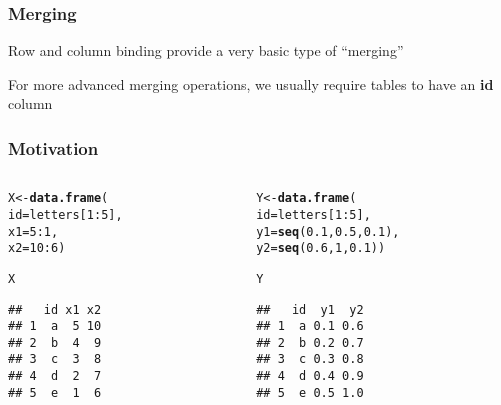 \documentclass[12pt]{beamer}\usepackage[]{graphicx}\usepackage[]{color}
\makeatletter
\newcommand{\hlnum}[1]{\textcolor[rgb]{0.686,0.059,0.569}{#1}}%
\newcommand{\hlopt}[1]{\textcolor[rgb]{0,0,0}{#1}}%
\newcommand{\hlstd}[1]{\textcolor[rgb]{0.345,0.345,0.345}{#1}}%
\newcommand{\hlkwb}[1]{\textcolor[rgb]{0.69,0.353,0.396}{#1}}%
\newcommand{\hlkwc}[1]{\textcolor[rgb]{0.333,0.667,0.333}{#1}}%
\newcommand{\hlkwd}[1]{\textcolor[rgb]{0.737,0.353,0.396}{\textbf{#1}}}%
\newenvironment{kframe}{%
 \def\at@end@of@kframe{}%
 \ifinner\ifhmode%
  \def\at@end@of@kframe{\end{minipage}}%
  \begin{minipage}{\columnwidth}%
 \fi\fi%
 \def\FrameCommand##1{\hskip\@totalleftmargin \hskip-\fboxsep
 \colorbox{shadecolor}{##1}\hskip-\fboxsep
     \hskip-\linewidth \hskip-\@totalleftmargin \hskip\columnwidth}%
 \MakeFramed {\advance\hsize-\width
   \@totalleftmargin\z@ \linewidth\hsize
   \@setminipage}}%
 {\par\unskip\endMakeFramed%
 \at@end@of@kframe}
\newenvironment{knitrout}{}{} %
\makeatother
\begin{document}

\begin{frame}[fragile]
\frametitle{Merging}

\bbi
  \item Row and column binding provide a very basic type of ``merging''
  \item For more advanced merging operations, we usually require tables to have an \textbf{id} column
\ei

\end{frame}


\begin{frame}[fragile]
\frametitle{Motivation}

\begin{columns}[t]
\begin{column}{0.4\textwidth}
\begin{knitrout}\footnotesize
{}\color{fgcolor}\begin{kframe}
\begin{alltt}
\hlstd{X} \hlkwb{<-} \hlkwd{data.frame}\hlstd{(}
  \hlkwc{id} \hlstd{= letters[}\hlnum{1}\hlopt{:}\hlnum{5}\hlstd{],}
  \hlkwc{x1} \hlstd{=} \hlnum{5}\hlopt{:}\hlnum{1}\hlstd{,}
  \hlkwc{x2} \hlstd{=} \hlnum{10}\hlopt{:}\hlnum{6}\hlstd{)}

\hlstd{X}
\end{alltt}
\begin{verbatim}
##   id x1 x2
## 1  a  5 10
## 2  b  4  9
## 3  c  3  8
## 4  d  2  7
## 5  e  1  6
\end{verbatim}
\end{kframe}
\end{knitrout}
\end{column}

\begin{column}{0.5\textwidth}
\begin{knitrout}\footnotesize
{}\color{fgcolor}\begin{kframe}
\begin{alltt}
\hlstd{Y} \hlkwb{<-} \hlkwd{data.frame}\hlstd{(}
  \hlkwc{id} \hlstd{= letters[}\hlnum{1}\hlopt{:}\hlnum{5}\hlstd{],}
  \hlkwc{y1} \hlstd{=} \hlkwd{seq}\hlstd{(}\hlnum{0.1}\hlstd{,} \hlnum{0.5}\hlstd{,} \hlnum{0.1}\hlstd{),}
  \hlkwc{y2} \hlstd{=} \hlkwd{seq}\hlstd{(}\hlnum{0.6}\hlstd{,} \hlnum{1}\hlstd{,} \hlnum{0.1}\hlstd{))}

\hlstd{Y}
\end{alltt}
\begin{verbatim}
##   id  y1  y2
## 1  a 0.1 0.6
## 2  b 0.2 0.7
## 3  c 0.3 0.8
## 4  d 0.4 0.9
## 5  e 0.5 1.0
\end{verbatim}
\end{kframe}
\end{knitrout}
\end{column}
\end{columns}

\end{frame}
\end{document}
